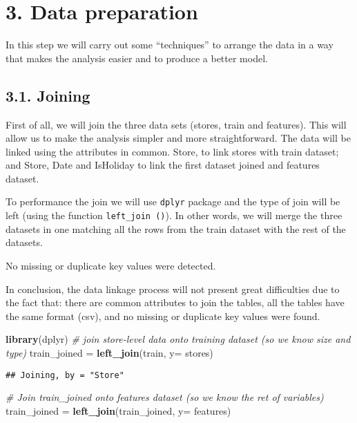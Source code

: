 \documentclass[11pt,]{article}
\newenvironment{Shaded}{\begin{snugshade}}{\end{snugshade}}
\newcommand{\KeywordTok}[1]{\textcolor[rgb]{0.13,0.29,0.53}{\textbf{{#1}}}}
\newcommand{\DataTypeTok}[1]{\textcolor[rgb]{0.13,0.29,0.53}{{#1}}}
\newcommand{\StringTok}[1]{\textcolor[rgb]{0.31,0.60,0.02}{{#1}}}
\newcommand{\CommentTok}[1]{\textcolor[rgb]{0.56,0.35,0.01}{\textit{{#1}}}}
\newcommand{\NormalTok}[1]{{#1}}
\begin{document}
\section{3. Data preparation}\label{data-preparation}

In this step we will carry out some ``techniques'' to arrange the data
in a way that makes the analysis easier and to produce a better model.

\subsection{3.1. Joining}\label{joining}

First of all, we will join the three data sets (stores, train and
features). This will allow us to make the analysis simpler and more
straightforward. The data will be linked using the attributes in common.
Store, to link stores with train dataset; and Store, Date and IsHoliday
to link the first dataset joined and features dataset.

To performance the join we will use \texttt{dplyr} package and the type
of join will be left (using the function \texttt{left\_join\ ()}). In
other words, we will merge the three datasets in one matching all the
rows from the train dataset with the rest of the datasets.

No missing or duplicate key values were detected.

In conclusion, the data linkage process will not present great
difficulties due to the fact that: there are common attributes to join
the tables, all the tables have the same format (csv), and no missing or
duplicate key values were found.

\begin{Shaded}
\begin{Highlighting}[]
\KeywordTok{library}\NormalTok{(dplyr)}
\CommentTok{# join store-level data onto training dataset (so we know size and type)}
\NormalTok{train_joined =}\StringTok{ }\KeywordTok{left_join}\NormalTok{(train, }\DataTypeTok{y=} \NormalTok{stores)}
\end{Highlighting}
\end{Shaded}

\begin{verbatim}
## Joining, by = "Store"
\end{verbatim}

\begin{Shaded}
\begin{Highlighting}[]
\CommentTok{# Join train_joined onto features dataset (so we know the ret of variables)}
\NormalTok{train_joined =}\StringTok{ }\KeywordTok{left_join}\NormalTok{(train_joined, }\DataTypeTok{y=} \NormalTok{features)}
\end{Highlighting}
\end{Shaded}
\end{document}
